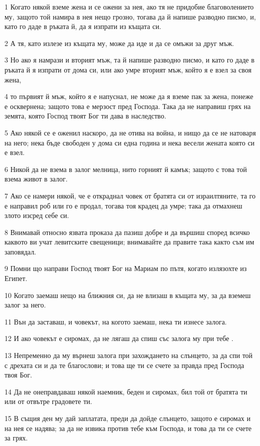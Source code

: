 \par 1 Когато някой вземе жена и се ожени за нея, ако тя не придобие благоволението му, защото той намира в нея нещо грозно, тогава да й напише разводно писмо, и, като го даде в ръката й, да я изпрати из къщата си.
\par 2 А тя, като излезе из къщата му, може да иде и да се омъжи за друг мъж.
\par 3 Но ако я намрази и вторият мъж, та й напише разводно писмо, и като го даде в ръката й я изпрати от дома си, или ако умре вторият мъж, който я е взел за своя жена,
\par 4 то първият й мъж, който я е напуснал, не може да я вземе пак за жена, понеже е осквернена; защото това е мерзост пред Господа. Така да не направиш грях на земята, която Господ твоят Бог ти дава в наследство.
\par 5 Ако някой се е оженил наскоро, да не отива на война, и нищо да се не натоваря на него; нека бъде свободен у дома си една година и нека весели жената която си е взел.
\par 6 Никой да не взема в залог мелница, нито горният й камък; защото с това той взема живот в залог.
\par 7 Ако се намери някой, че е откраднал човек от братята си от израилтяните, та го е направил роб или го е продал, тогава тоя крадец да умре; така да отмахнеш злото изсред себе си.
\par 8 Внимавай относно язвата проказа да пазиш добре и да вършиш според всичко каквото ви учат левитските свещеници; внимавайте да правите така както съм им заповядал.
\par 9 Помни що направи Господ твоят Бог на Мариам по пътя, когато излязохте из Египет.
\par 10 Когато заемаш нещо на ближния си, да не влизаш в къщата му, за да вземеш залог за него.
\par 11 Вън да заставаш, и човекът, на когото заемаш, нека ти изнесе залога.
\par 12 И ако човекът е сиромах, да не лягаш да спиш със залога му при тебе .
\par 13 Непременно да му върнеш залога при захождането на слънцето, за да спи той с дрехата си и да те благослови; и това ще ти се счете за правда пред Господа твоя Бог.
\par 14 Да не онеправдаваш някой наемник, беден и сиромах, бил той от братята ти или от отвътре градовете ти.
\par 15 В същия ден му дай заплатата, преди да дойде слънцето, защото е сиромах и на нея се надява; за да не извика против тебе към Господа, и това да ти се счете за грях.
